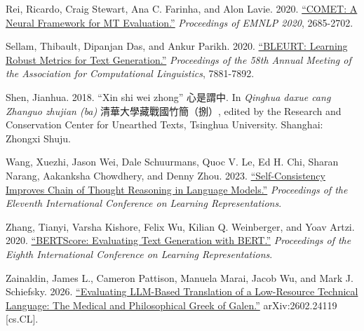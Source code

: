 \documentclass[
  12pt,
]{article}
\begin{document}
Rei, Ricardo, Craig Stewart, Ana C. Farinha, and Alon Lavie. 2020.
\href{https://aclanthology.org/2020.emnlp-main.213/}{``COMET: A Neural
Framework for MT Evaluation.''} \emph{Proceedings of EMNLP 2020},
2685-2702.

Sellam, Thibault, Dipanjan Das, and Ankur Parikh. 2020.
\href{https://aclanthology.org/2020.acl-main.704/}{``BLEURT: Learning
Robust Metrics for Text Generation.''} \emph{Proceedings of the 58th
Annual Meeting of the Association for Computational Linguistics},
7881-7892.

Shen, Jianhua. 2018. ``Xin shi wei zhong'' 心是謂中. In \emph{Qinghua
daxue cang Zhanguo zhujian (ba)} 清華大學藏戰國竹簡（捌）, edited by the
Research and Conservation Center for Unearthed Texts, Tsinghua
University. Shanghai: Zhongxi Shuju.

Wang, Xuezhi, Jason Wei, Dale Schuurmans, Quoc V. Le, Ed H. Chi, Sharan
Narang, Aakanksha Chowdhery, and Denny Zhou. 2023.
\href{https://doi.org/10.48550/arXiv.2203.11171}{``Self-Consistency
Improves Chain of Thought Reasoning in Language Models.''}
\emph{Proceedings of the Eleventh International Conference on Learning
Representations}.

Zhang, Tianyi, Varsha Kishore, Felix Wu, Kilian Q. Weinberger, and Yoav
Artzi. 2020.
\href{https://openreview.net/forum?id=SkeHuCVFDr}{``BERTScore:
Evaluating Text Generation with BERT.''} \emph{Proceedings of the Eighth
International Conference on Learning Representations}.

Zainaldin, James L., Cameron Pattison, Manuela Marai, Jacob Wu, and Mark
J. Schiefsky. 2026.
\href{https://doi.org/10.48550/arXiv.2602.24119}{``Evaluating LLM-Based
Translation of a Low-Resource Technical Language: The Medical and
Philosophical Greek of Galen.''} arXiv:2602.24119 {[}cs.CL{]}.
\end{document}

